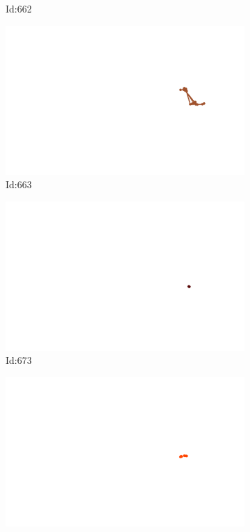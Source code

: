 \documentclass[12pt,twoside]{report}
\begin{document}
\begin{figure}
\begin{subfigure}[b]{0.20\textwidth}
\caption{Id:662}
\end{subfigure}
\begin{subfigure}[b]{0.20\textwidth}
\centering
\includegraphics[width=\textwidth]{../trajectories/663.png}
\caption{Id:663}
\end{subfigure}
\begin{subfigure}[b]{0.20\textwidth}
\centering
\includegraphics[width=\textwidth]{../trajectories/673.png}
\caption{Id:673}
\end{subfigure}
\begin{subfigure}[b]{0.20\textwidth}
\centering
\includegraphics[width=\textwidth]{../trajectories/695.png}

\end{subfigure}
\end{figure}
\end{document}
